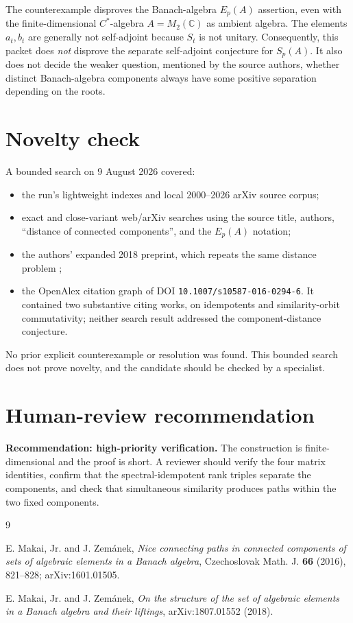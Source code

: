 \documentclass[11pt]{article}
\newcommand{\C}{\mathbb C}
\begin{document}
The counterexample disproves the Banach-algebra $E_p(A)$ assertion, even with
the finite-dimensional $C^*$-algebra $A=M_2(\C)$ as ambient algebra.  The
elements $a_t,b_t$ are generally not self-adjoint because $S_t$ is not
unitary.  Consequently, this packet does \emph{not} disprove the separate
self-adjoint conjecture for $S_p(A)$.  It also does not decide the weaker
question, mentioned by the source authors, whether distinct Banach-algebra
components always have some positive separation depending on the roots.

\section{\hspace{0.25em}Novelty check}

A bounded search on 9 August 2026 covered:
\begin{itemize}[leftmargin=*]
\item the run's lightweight indexes and local 2000--2026 arXiv source corpus;
\item exact and close-variant web/arXiv searches using the source title,
authors, ``distance of connected components'', and the $E_p(A)$ notation;
\item the authors' expanded 2018 preprint, which repeats the same distance
problem \cite{MZ18};
\item the OpenAlex citation graph of DOI
\texttt{10.1007/s10587-016-0294-6}.  It contained two substantive citing
works, on idempotents and similarity-orbit commutativity; neither search result
addressed the component-distance conjecture.
\end{itemize}
No prior explicit counterexample or resolution was found.  This bounded search
does not prove novelty, and the candidate should be checked by a specialist.

\section{\hspace{0.25em}Human-review recommendation}

\textbf{Recommendation: high-priority verification.}  The construction is
finite-dimensional and the proof is short.  A reviewer should verify the four
matrix identities, confirm that the spectral-idempotent rank triples separate
the components, and check that simultaneous similarity produces paths within
the two fixed components.

\begin{thebibliography}{9}

E. Makai, Jr. and J. Zem\'anek,
\emph{Nice connecting paths in connected components of sets of algebraic
elements in a Banach algebra},
Czechoslovak Math. J. \textbf{66} (2016), 821--828;
arXiv:1601.01505.

E. Makai, Jr. and J. Zem\'anek,
\emph{On the structure of the set of algebraic elements in a Banach algebra
and their liftings},
arXiv:1807.01552 (2018).

\end{thebibliography}
\end{document}
